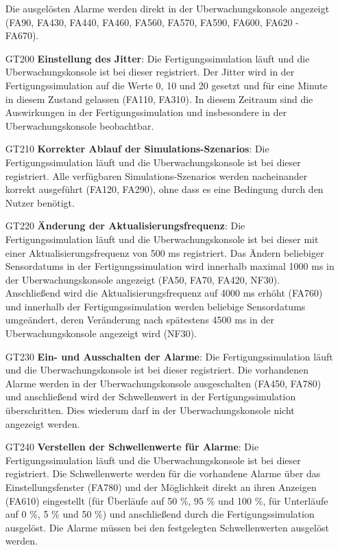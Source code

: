 \documentclass[parskip=full]{scrartcl}
\begin{document}
\begin{enumerate}
   Die ausgelösten Alarme werden direkt in der \gls{Uberwachungskonsole} angezeigt (FA90, FA430, FA440, FA460, FA560, FA570, FA590, FA600, FA620 - FA670).
  \item[GT200] \textbf{Einstellung des \gls{Jitter}}: Die \gls{Fertigungssimulation} läuft und die \gls{Uberwachungskonsole} ist bei dieser registriert.
   Der \gls{Jitter} wird in der \gls{Fertigungssimulation} auf die Werte 0, 10 und 20 gesetzt und für eine Minute in diesem Zustand gelassen (FA110, FA310). In diesem Zeitraum sind die Auswirkungen
   in der \gls{Fertigungssimulation} und insbesondere in der \gls{Uberwachungskonsole} beobachtbar.
  \item[GT210] \textbf{Korrekter Ablauf der \glspl{Simulations-Szenario}}: Die \gls{Fertigungssimulation} läuft und die \gls{Uberwachungskonsole} ist bei dieser registriert.
   Alle verfügbaren \glspl{Simulations-Szenario} werden nacheinander korrekt ausgeführt (FA120, FA290), ohne dass es eine Bedingung durch den Nutzer benötigt.
  \item[GT220] \textbf{Änderung der Aktualisierungsfrequenz}: Die \gls{Fertigungssimulation} läuft und die \gls{Uberwachungskonsole} ist bei dieser mit einer Aktualisierungsfrequenz von 500 ms
   registriert. Das Ändern beliebiger \glspl{Sensordatum} in der \gls{Fertigungssimulation} wird innerhalb maximal 1000 ms in der \gls{Uberwachungskonsole} angezeigt (FA50, FA70, FA420, NF30).
   Anschließend wird die Aktualisierungsfrequenz auf 4000 ms erhöht (FA760) und innerhalb der \gls{Fertigungssimulation} werden beliebige \glspl{Sensordatum} umgeändert, deren
   Veränderung nach spätestens 4500 ms in der \gls{Uberwachungskonsole} angezeigt wird (NF30).
  \item[GT230] \textbf{Ein- und Ausschalten der Alarme}: Die \gls{Fertigungssimulation} läuft und die \gls{Uberwachungskonsole} ist bei dieser registriert.
   Die vorhandenen Alarme werden in der \gls{Uberwachungskonsole} ausgeschalten (FA450, FA780) und anschließend wird der Schwellenwert in der \gls{Fertigungssimulation} überschritten.
   Dies wiederum darf in der \gls{Uberwachungskonsole} nicht angezeigt werden.
  \item[GT240] \textbf{Verstellen der Schwellenwerte für Alarme}: Die \gls{Fertigungssimulation} läuft und die \gls{Uberwachungskonsole} ist bei dieser registriert.
   Die Schwellenwerte werden für die vorhandene Alarme über das Einstellungsfenster (FA780) und der Möglichkeit direkt an ihren Anzeigen (FA610) eingestellt (für Überläufe auf 50 \%, 95 \% und 100 \%, für Unterläufe auf 0 \%, 5 \% und 50 \%) und anschließend durch die \gls{Fertigungssimulation} ausgelöst. Die Alarme müssen bei den festgelegten Schwellenwerten ausgelöst werden.

\end{enumerate}
\end{document}
